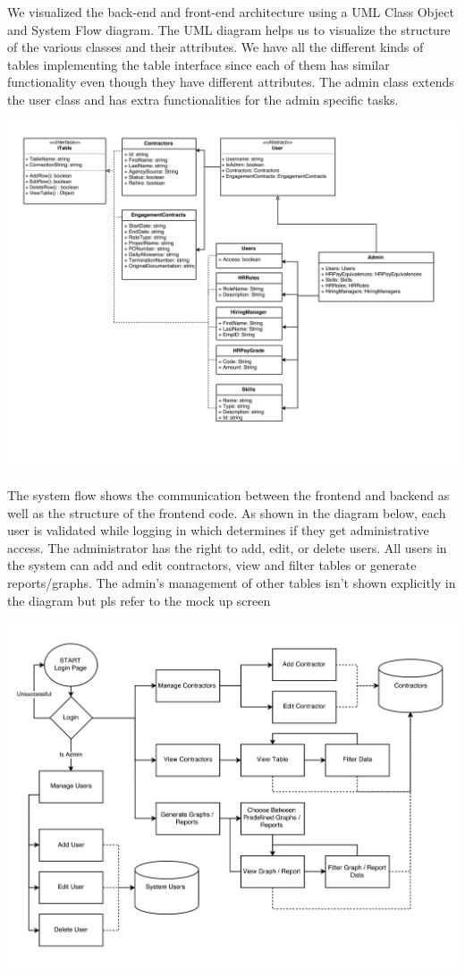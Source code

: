 \documentclass[11pt, titlepage]{article}
\begin{document}
We visualized the back-end and front-end architecture using a UML Class Object and System Flow diagram. The UML diagram helps us to visualize the structure of the various classes and their attributes. We have all the different kinds of tables implementing the table interface since each of them has similar functionality even though they have different attributes. The admin class extends the user class and has extra functionalities for the admin specific tasks.

\includegraphics[width=1.0\textwidth]{../design/uml-1}

The system flow shows the communication between the frontend and backend as well as the structure of the frontend code. As shown in the diagram below, each user is validated while logging in which determines if they get administrative access. The administrator has the right to add, edit, or delete users. All users in the system can add and edit contractors, view and filter tables or generate reports/graphs. The admin's management of other tables isn't shown explicitly in the diagram but pls refer to the mock up screen

\includegraphics[width=1.0\textwidth]{../design/FlowChart}
\end{document}
